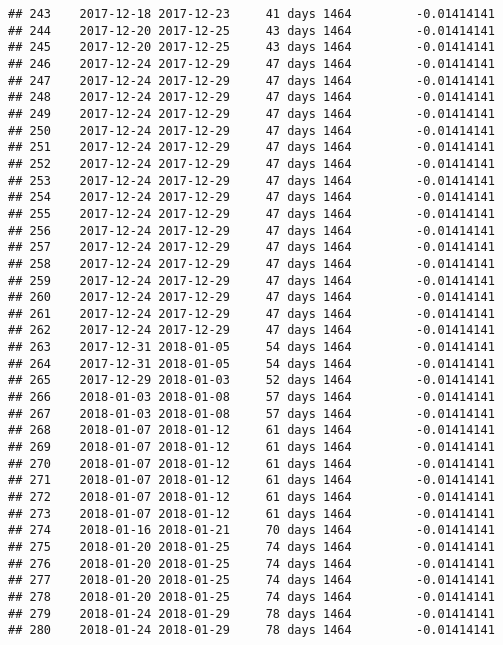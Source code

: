 \documentclass[]{article}
\begin{document}
\begin{verbatim}
## 243    2017-12-18 2017-12-23     41 days 1464         -0.01414141
## 244    2017-12-20 2017-12-25     43 days 1464         -0.01414141
## 245    2017-12-20 2017-12-25     43 days 1464         -0.01414141
## 246    2017-12-24 2017-12-29     47 days 1464         -0.01414141
## 247    2017-12-24 2017-12-29     47 days 1464         -0.01414141
## 248    2017-12-24 2017-12-29     47 days 1464         -0.01414141
## 249    2017-12-24 2017-12-29     47 days 1464         -0.01414141
## 250    2017-12-24 2017-12-29     47 days 1464         -0.01414141
## 251    2017-12-24 2017-12-29     47 days 1464         -0.01414141
## 252    2017-12-24 2017-12-29     47 days 1464         -0.01414141
## 253    2017-12-24 2017-12-29     47 days 1464         -0.01414141
## 254    2017-12-24 2017-12-29     47 days 1464         -0.01414141
## 255    2017-12-24 2017-12-29     47 days 1464         -0.01414141
## 256    2017-12-24 2017-12-29     47 days 1464         -0.01414141
## 257    2017-12-24 2017-12-29     47 days 1464         -0.01414141
## 258    2017-12-24 2017-12-29     47 days 1464         -0.01414141
## 259    2017-12-24 2017-12-29     47 days 1464         -0.01414141
## 260    2017-12-24 2017-12-29     47 days 1464         -0.01414141
## 261    2017-12-24 2017-12-29     47 days 1464         -0.01414141
## 262    2017-12-24 2017-12-29     47 days 1464         -0.01414141
## 263    2017-12-31 2018-01-05     54 days 1464         -0.01414141
## 264    2017-12-31 2018-01-05     54 days 1464         -0.01414141
## 265    2017-12-29 2018-01-03     52 days 1464         -0.01414141
## 266    2018-01-03 2018-01-08     57 days 1464         -0.01414141
## 267    2018-01-03 2018-01-08     57 days 1464         -0.01414141
## 268    2018-01-07 2018-01-12     61 days 1464         -0.01414141
## 269    2018-01-07 2018-01-12     61 days 1464         -0.01414141
## 270    2018-01-07 2018-01-12     61 days 1464         -0.01414141
## 271    2018-01-07 2018-01-12     61 days 1464         -0.01414141
## 272    2018-01-07 2018-01-12     61 days 1464         -0.01414141
## 273    2018-01-07 2018-01-12     61 days 1464         -0.01414141
## 274    2018-01-16 2018-01-21     70 days 1464         -0.01414141
## 275    2018-01-20 2018-01-25     74 days 1464         -0.01414141
## 276    2018-01-20 2018-01-25     74 days 1464         -0.01414141
## 277    2018-01-20 2018-01-25     74 days 1464         -0.01414141
## 278    2018-01-20 2018-01-25     74 days 1464         -0.01414141
## 279    2018-01-24 2018-01-29     78 days 1464         -0.01414141
## 280    2018-01-24 2018-01-29     78 days 1464         -0.01414141

\end{verbatim}
\end{document}
